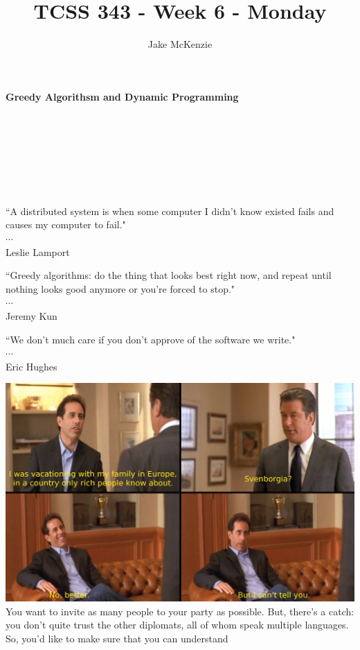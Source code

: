 \documentclass[12pt]{article}
\begin{document}
\title{TCSS 343 - Week 6 - Monday}
\author{Jake McKenzie}
\maketitle
\noindent\centerline{\textbf{Greedy Algorithsm and Dynamic Programming}}\\\\\\\\\\\\
\begin{center}
    ``A distributed system is when some computer I didn't know existed fails and causes my computer to fail." \\$\cdots$\\ Leslie Lamport
\end{center}
\begin{center}
    ``Greedy algorithms: do the thing that looks best right now, and repeat until nothing looks good anymore or you're forced to stop." \\$\cdots$\\ Jeremy Kun
\end{center}
\begin{center}
    ``We don't much care if you don't approve of the software we write." \\$\cdots$\\ Eric Hughes
\end{center}
\newpage
\includegraphics[width=\textwidth]{svenborgia.jpg}\\
    \noindent You want to invite as many people to your party as possible. 
    But, there’s a catch: you don’t quite trust the
    other diplomats, all of whom speak multiple languages. 
    So, you’d like to make sure that you can understand
\end{document}
